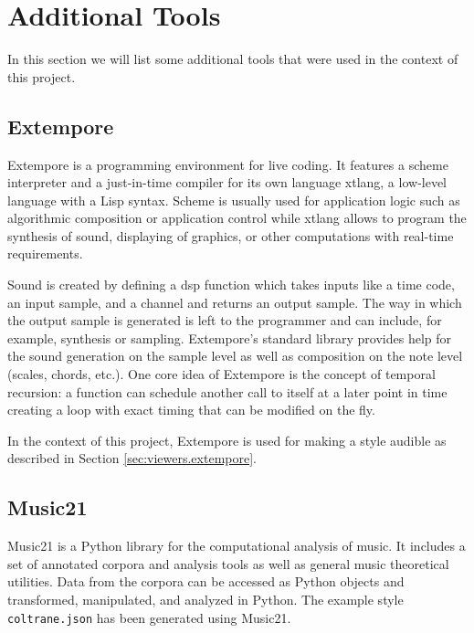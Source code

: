 \section{Additional Tools}
\label{sec:tools}

In this section we will list some additional tools that were used in the context of this project.

\subsection{Extempore}
\label{sec:tools.extempore}

Extempore \cite{extempore} is a programming environment for live coding.
It features a scheme interpreter and a just-in-time compiler for its own language xtlang, a low-level language with a Lisp syntax.
Scheme is usually used for application logic such as algorithmic composition or application control while xtlang allows to program the synthesis of sound, displaying of graphics, or other computations with real-time requirements.

Sound is created by defining a dsp function which takes inputs like a time code, an input sample, and a channel and returns an output sample.
The way in which the output sample is generated is left to the programmer and can include, for example, synthesis or sampling.
Extempore's standard library provides help for the sound generation on the sample level as well as composition on the note level (scales, chords, etc.).
One core idea of Extempore is the concept of temporal recursion: a function can schedule another call to itself at a later point in time creating a loop with exact timing that can be modified on the fly.

In the context of this project, Extempore is used for making a style audible as described in Section \ref{sec:viewers.extempore}.

\subsection{Music21}
\label{sec:tools.music21}

Music21 \cite{music21} is a Python library for the computational analysis of music.
It includes a set of annotated corpora and analysis tools as well as general music theoretical utilities.
Data from the corpora can be accessed as Python objects and transformed, manipulated, and analyzed in Python.
The example style \texttt{coltrane.json} has been generated using Music21.

